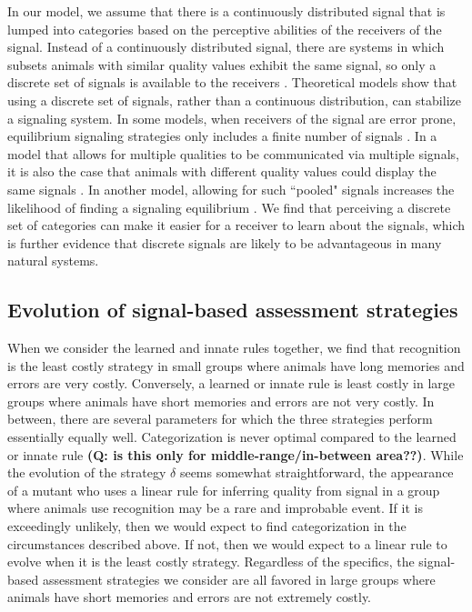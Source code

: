 In our model, we assume that there is a continuously distributed signal that is lumped into categories based on the perceptive abilities of the receivers of the signal. Instead of a continuously distributed signal, there are systems in which subsets animals with similar quality values exhibit the same signal, so only a discrete set of signals is available to the receivers \citep{Johnstone:1994uq}. Theoretical models show that using a discrete set of signals, rather than a continuous distribution, can stabilize a signaling system. In some models, when receivers of the signal are error prone, equilibrium signaling strategies only includes a finite number of signals \citep{Grafen:1993kx,Johnstone:1994uq}. In a model that allows for multiple qualities to be communicated via multiple signals, it is also the case that animals with different quality values could display the same signals \citep{Johnstone:1995vn}. In another model, allowing for such ``pooled" signals increases the likelihood of finding a signaling equilibrium \citep{Lachmann:1998fk}. We find that perceiving a discrete set of categories can make it easier for a receiver to learn about the signals, which is further evidence that discrete signals are likely to be advantageous in many natural systems.

\subsection*{Evolution of signal-based assessment strategies} 

When we consider the learned and innate rules together, we find that recognition is the least costly strategy in small groups where animals have long memories and errors are very costly. Conversely, a learned or innate rule is least costly in large groups where animals have short memories and errors are not very costly. In between, there are several parameters for which the three strategies perform essentially equally well. Categorization is never optimal compared to the learned or innate rule \textbf{(Q: is this only for middle-range/in-between area??)}. While the evolution of the strategy $\delta$ seems somewhat straightforward, the appearance of a mutant who uses a linear rule for inferring quality from signal in a group where animals use recognition may be a rare and improbable event. If it is exceedingly unlikely, then we would expect to find categorization in the circumstances described above. If not, then we would expect to a linear rule to evolve when it is the least costly strategy. Regardless of the specifics, the signal-based assessment strategies we consider are all favored in large groups where animals have short memories and errors are not extremely costly.

